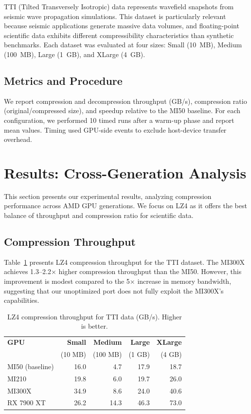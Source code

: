 \documentclass[runningheads]{llncs}
\begin{document}
TTI (Tilted Transversely Isotropic) data represents wavefield snapshots from seismic wave propagation simulations. This dataset is particularly relevant because seismic applications generate massive data volumes, and floating-point scientific data exhibits different compressibility characteristics than synthetic benchmarks. Each dataset was evaluated at four sizes: Small (10~MB), Medium (100~MB), Large (1~GB), and XLarge (4~GB).

\subsection{Metrics and Procedure}

We report compression and decompression throughput (GB/s), compression ratio (original/compressed size), and speedup relative to the MI50 baseline. For each configuration, we performed 10 timed runs after a warm-up phase and report mean values. Timing used GPU-side events to exclude host-device transfer overhead.


\section{Results: Cross-Generation Analysis}
\label{sec:results}

This section presents our experimental results, analyzing compression performance across AMD GPU generations. We focus on LZ4 as it offers the best balance of throughput and compression ratio for scientific data.

\subsection{Compression Throughput}

Table~\ref{tab:comp_lz4} presents LZ4 compression throughput for the TTI dataset. The MI300X achieves 1.3--2.2$\times$ higher compression throughput than the MI50. However, this improvement is modest compared to the 5$\times$ increase in memory bandwidth, suggesting that our unoptimized port does not fully exploit the MI300X's capabilities.

\begin{table}[t]
\centering
\caption{LZ4 compression throughput for TTI data (GB/s). Higher is better.}
\label{tab:comp_lz4}
\begin{tabular}{lrrrr}
\toprule
\textbf{GPU} & \textbf{Small} & \textbf{Medium} & \textbf{Large} & \textbf{XLarge} \\
 & (10 MB) & (100 MB) & (1 GB) & (4 GB) \\
\midrule
MI50 (baseline) & 16.0 & 4.7 & 17.9 & 18.7 \\
MI210 & 19.8 & 6.0 & 19.7 & 26.0 \\
MI300X & 34.9 & 8.6 & 24.0 & 40.6 \\
RX 7900 XT & 26.2 & 14.3 & 46.3 & 73.0 \\
\bottomrule
\end{tabular}
\end{table}
\end{document}
